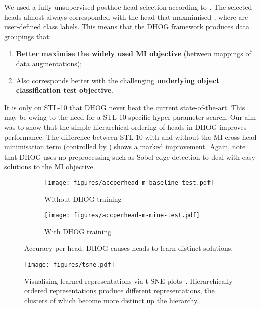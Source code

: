 \documentclass[runningheads]{llncs}
\begin{document}
We used a fully unsupervised posthoc head selection according to . The selected heads almost always corresponded with the head that maxmimised , where  are user-defined class labels. This means that the DHOG framework produces data groupings that:
\begin{enumerate}
    \item \textbf{Better maximise the widely used MI objective} (between mappings of data augmentations);
    \item Also corresponds better with the challenging \textbf{underlying object classification test objective}.
\end{enumerate}

It is only on STL-10 that DHOG never beat the current state-of-the-art. This may be owing to the need for a STL-10 specific hyper-parameter search. Our aim was to show that the simple hierarchical ordering of heads in DHOG improves performance. The difference between STL-10 with and without the MI cross-head minimisation term (controlled by ) shows a marked improvement. Again, note that DHOG uses no preprocessing such as Sobel edge detection to deal with easy solutions to the MI objective.

\begin{figure}[htb]
\begin{center}
\begin{subfigure}{0.35\textwidth}
\texttt{[image: figures/accperhead-m-baseline-test.pdf]}
\caption{Without DHOG training}
\end{subfigure}
\hspace{1cm}
\begin{subfigure}{0.35\textwidth}
\texttt{[image: figures/accperhead-m-mine-test.pdf]}
\caption{With DHOG training}
\end{subfigure}
\end{center}
  \caption{Accuracy per head. DHOG causes heads to learn distinct solutions.}
  
\label{fig:accphead}
\end{figure}

\begin{figure}[htb]
\begin{center}
{\texttt{[image: figures/tsne.pdf]}}
\vspace{-5mm}

\end{center}
  \caption{Visualising learned representations via t-SNE plots~\cite{maaten2008visualizing}. Hierarchically ordered representations produce different representations, the clusters of which become more distinct up the hierarchy. \vspace{-6mm}}
  
\label{fig:tsne}
\end{figure}
\end{document}

